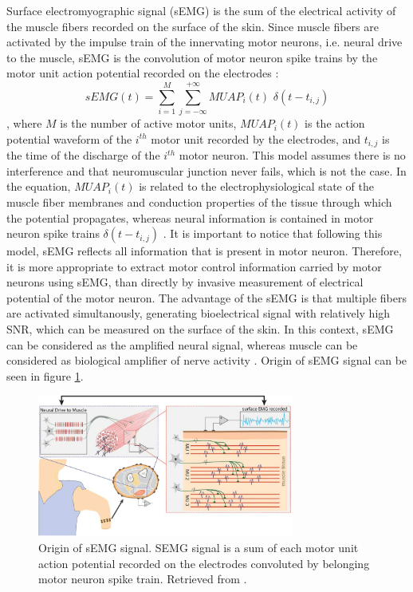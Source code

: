 Surface electromyographic signal (sEMG) is the sum of the electrical activity of the muscle fibers recorded on the surface of the skin. Since muscle fibers are activated by the impulse train of the innervating motor neurons, i.e. neural drive to the muscle, sEMG is the convolution of motor neuron spike trains by the motor unit action potential recorded on the electrodes \citep{Farina2010, Farina2014}:
\begin{equation}
sEMG(t) = \sum_{i=1}^{M} \sum_{j=-\infty}^{+\infty} MUAP_i(t)\,\, \delta(t-t_{i,j})
\end{equation}
, where $M$ is the number of active motor units, $MUAP_i(t)$ is the action potential waveform of the $i^{th}$ motor unit recorded by the electrodes, and $t_{i,j}$ is the time of the discharge of the $i^{th}$ motor neuron. This model assumes there is no interference and that neuromuscular junction never fails, which is not the case. In the equation, $MUAP_i(t)$ is related to the electrophysiological state of the muscle fiber membranes and conduction properties of the tissue through which the potential propagates, whereas neural information is contained in motor neuron spike trains $\delta(t-t_{i,j})$ \citep{Farina2014b}. It is important to notice that following this model, sEMG reflects all information that is present in motor neuron. Therefore, it is more appropriate to extract motor control information carried by motor neurons using sEMG, than directly by invasive measurement of electrical potential of the motor neuron. The advantage of the sEMG is that multiple fibers are activated simultanously, generating bioelectrical signal with relatively high SNR, which can be measured on the surface of the skin. In this context, sEMG can be considered as the amplified neural signal, whereas muscle can be considered as biological amplifier of nerve activity \citep{Farina2014}. Origin of sEMG signal can be seen in figure \ref{fig:EMG_origin}.
\begin{figure}[ht]
\centering
\includegraphics[width=0.75\textwidth]{Images/introduction/EMG_origin.png}
\caption{Origin of sEMG signal. SEMG signal is a sum of each motor unit action potential recorded on the electrodes convoluted by belonging motor neuron spike train. Retrieved from \citep{Farina2014}.}
\label{fig:EMG_origin}
\end{figure}



